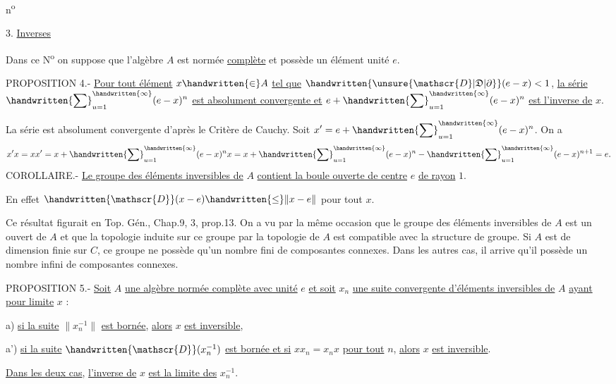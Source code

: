 \hfill n\textsuperscript{o} 

3. \uline{Inverses}

Dans ce N\textsuperscript{o} on suppose que l'algèbre $A$ est normée \uline{complète} et possède un élément unité $e$.

PROPOSITION 4.- \uline{Pour tout élément} $x\handwritten{\in}A$ \uline{tel que} $\handwritten{\unsure{\mathscr{D}|\mathfrak{D}|\partial}}(e-x)<1$, \uline{la série} $\displaystyle\handwritten{\sum}_{u=1}^{\handwritten{\infty}}(e-x)^n$ \uline{est absolument convergente et} $\displaystyle e+\handwritten{\sum}_{u=1}^{\handwritten{\infty}}(e-x)^n$ \uline{est l'inverse de} $x$.

La série est absolument convergente d'après le Critère de Cauchy. Soit $\displaystyle x'=e+\handwritten{\sum}_{u=1}^{\handwritten{\infty}}(e-x)^n$. On a
\[
x'x=xx'=x+\handwritten{\sum}_{u=1}^{\handwritten{\infty}}(e-x)^n x=x+\handwritten{\sum}_{u=1}^{\handwritten{\infty}}(e-x)^n-\handwritten{\sum}_{u=1}^{\handwritten{\infty}}(e-x)^{n+1}=e.
\]
COROLLAIRE.- \uline{Le groupe des éléments inversibles de} $A$ \uline{contient la boule ouverte de centre} $e$ \uline{de rayon} $1$.

En effet $\handwritten{\mathscr{D}}(x-e)\handwritten{\le}\lVert x-e\rVert$ pour tout $x$.

Ce résultat figurait en Top. Gén., Chap.9, \handwritten{\S} 3, prop.13. On a vu par la même occasion que le groupe des éléments inversibles de $A$ est un ouvert de $A$ et que la topologie induite sur ce groupe par la topologie de $A$ est compatible avec la structure de groupe. Si $A$ est de dimension finie sur $C$, ce groupe ne possède qu'un nombre fini de composantes connexes. Dans les autres cas, il arrive qu'il possède un nombre infini de composantes connexes.

PROPOSITION 5.- \uline{Soit} $A$ \uline{une algèbre normée complète avec unité} $e$ \uline{et soit} $x_n$ \uline{une suite convergente d'éléments inversibles de} $A$ \uline{ayant pour limite} $x$ :

a) \uline{si la suite} $\lVert x_n^{-1}\rVert$ \uline{est bornée}, \uline{alors} $x$ \uline{est inversible},

a') \uline{si la suite} $\handwritten{\mathscr{D}}(x_n^{-1})$ \uline{est bornée et si} $xx_n=x_nx$ \uline{pour tout} $n$, \uline{alors} $x$ \uline{est inversible}.

\uline{Dans les deux cas}, \uline{l'inverse de} $x$ \uline{est la limite des} $x_n^{-1}$.

